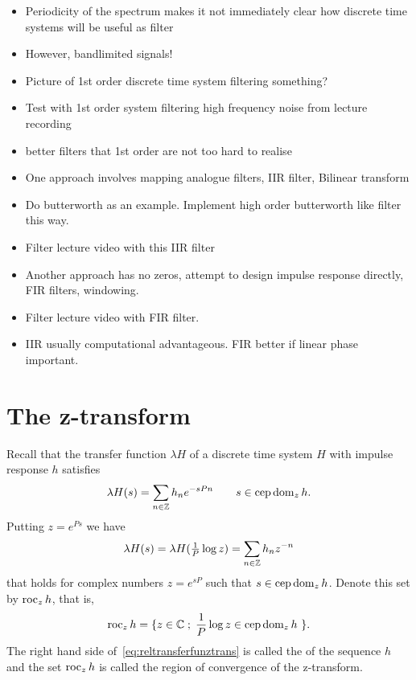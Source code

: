 \begin{itemize}

\item Periodicity of the spectrum makes it not immediately clear how discrete time systems will be useful as filter

\item However, bandlimited signals!

\item Picture of 1st order discrete time system filtering something?

\item Test with 1st order system filtering high frequency noise from lecture recording

\item better filters that 1st order are not too hard to realise

\item One approach involves mapping analogue filters, IIR filter,  Bilinear transform

\item Do butterworth as an example.  Implement high order butterworth like filter this way.

\item Filter lecture video with this IIR filter

\item Another approach has no zeros, attempt to design impulse response directly, FIR filters, windowing.

\item Filter lecture video with FIR filter.

\item IIR usually computational advantageous.  FIR better if linear phase important.

\end{itemize}


\section{The z-transform}

Recall that the transfer function $\lambda H$ of a discrete time system $H$ with impulse response $h$ satisfies
\[
\lambda H(s) = \sum_{n \in {\mathbb Z}} h_n e^{-sPn} \qquad s \in \operatorname{cep} \operatorname{dom}_z h.
\]
Putting $z = e^{Ps}$ we have
\begin{equation} \label{eq:reltransferfunztrans}
\lambda H(s) = \lambda H(\tfrac{1}{P} \log z) = \sum_{n \in {\mathbb Z}} h_n z^{-n} 
\end{equation}
that holds for complex numbers $z = e^{sP}$ such that $s \in \operatorname{cep}\operatorname{dom}_z h$.  Denote this set by $\operatorname{roc}_z h$, that is,
\[
\operatorname{roc}_z h = \{z \in {\mathbb C} \; ; \; \frac{1}{P} \log z \in \operatorname{cep} \operatorname{dom}_z h \ \}.
\]
The right hand side of~\eqref{eq:reltransferfunztrans} is called the  of the sequence $h$ and the set $\operatorname{roc}_z h$ is called the region of convergence of the z-transform.  

